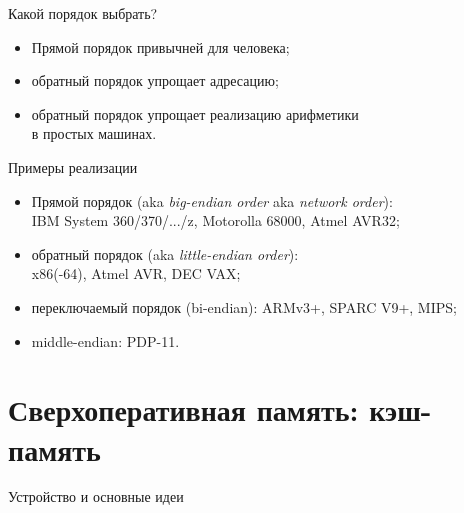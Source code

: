 \begin{frame}{Какой порядок выбрать?}
\pause
\begin{itemize}[<+->]\itemsep=.5cm
    \item Прямой порядок привычней для человека;
    \item обратный порядок упрощает адресацию;
    \item обратный порядок упрощает реализацию арифметики\\
         в простых машинах.
\end{itemize}
\end{frame}

\begin{frame}{Примеры реализации}
\begin{itemize}[<+->]\itemsep=.5cm
    \item Прямой порядок (aka \emph{big-endian order} aka \emph{network order}):\\
    IBM System 360/370/.../z, Motorolla 68000, Atmel AVR32;

    \item обратный порядок (aka \emph{little-endian order}):\\
    x86(-64), Atmel AVR, DEC VAX;

    \item переключаемый порядок (bi-endian): ARMv3+, SPARC V9+, MIPS;

    \item middle-endian: PDP-11.
\end{itemize}
\end{frame}

\section {Сверхоперативная память: кэш-память}

\begin{frame}{Устройство и основные идеи}
\end{frame}

